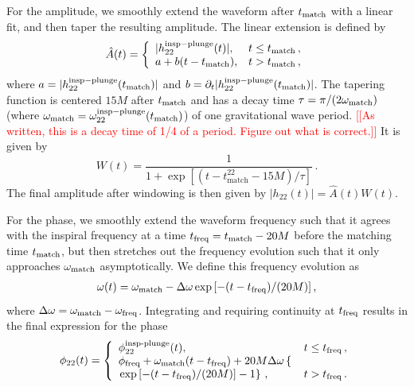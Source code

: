 \documentclass[prd,aps,letter,twocolumn,floatfix,notitlepage,nofootinbib]{revtex4-1}
\newcommand{\red}[1]{\textcolor{red}{#1}}
\begin{document}
For the amplitude, we smoothly extend the waveform after $t_{\rm match}$ with a linear fit, and then taper the resulting amplitude. The linear extension is defined by
\begin{align}
\hat{A}(t)=\left\{\begin{array}{ll}
|h_{22}^{\rm insp-plunge}(t)|, & t \leq t_{\rm match}\,, \\
a + b (t - t_{\rm match}), & t > t_{\rm match}\,,
\end{array}\right.
\end{align}
where $a = |h_{22}^{\rm insp-plunge}(t_{\rm match})|$ and $b=\partial_t |h_{22}^{\rm insp-plunge}(t_{\rm match})|$. The tapering function is centered $15M$ after $t_{\rm match}$ and has a decay time $\tau = \pi/(2\omega_{\rm match})$ (where $\omega_{\rm match} = \omega_{22}^{\rm insp-plunge}(t_{\rm match})$) of one gravitational wave period. \red{[[As written, this is a decay time of 1/4 of a period. Figure out what is correct.]]} It is given by
\begin{equation}
W(t) = \frac{1}{1+\exp{[(t- t^{22}_{\textrm{match}}-15M)/\tau]}}\,.
\end{equation}
The final amplitude after windowing is then given by $|h_{22}(t)| = \hat A(t) W(t)$.

For the phase, we smoothly extend the waveform frequency such that it agrees with the inspiral frequency at a time $t_{\rm freq} = t_{\rm match} - 20M$ before the matching time $t_{\rm match}$, but then stretches out the frequency evolution such that it only approaches $\omega_{\rm match}$ asymptotically. We define this frequency evolution as
\begin{align}
\omega(t) = \omega_{\rm match} - \Delta\omega \exp\left[ -(t - t_{\rm freq}) / (20M) \right],
\end{align}
where $\Delta\omega = \omega_{\rm match} - \omega_{\rm freq}$. Integrating and requiring continuity at $t_{\rm freq}$ results in the final expression for the phase
\begin{align}
\phi_{22}(t) = \left\{\begin{array}{ll}
\phi_{22}^{\textrm{insp-plunge}}(t), & t \leq t_{\rm freq} \,, \\
\phi_{\rm freq} + \omega_{\rm match}(t - t_{\rm freq}) + 20M \Delta\omega \left\{ \right. & \\
  \left. \exp\left[ -(t - t_{\rm freq}) / (20M) \right] - 1\right\} \,,& t > t_{\rm freq} \, .
\end{array}\right.
\end{align}
\end{document}
